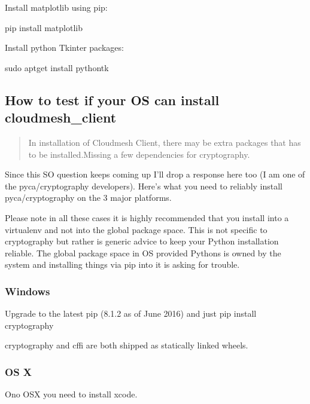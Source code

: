 Install matplotlib using pip:

\begin{sphinxVerbatim}[commandchars=\\\{\}]
\PYGZdl{} pip install matplotlib
\end{sphinxVerbatim}

Install python Tkinter packages:

\begin{sphinxVerbatim}[commandchars=\\\{\}]
\PYGZdl{} sudo apt\PYGZhy{}get install python\PYGZhy{}tk
\end{sphinxVerbatim}


\subsection{How to test if your OS can install cloudmesh\_client}
\label{\detokenize{faq:how-to-test-if-your-os-can-install-cloudmesh-client}}\begin{quote}

In installation of Cloudmesh Client, there may be extra packages that has to be installed.Missing a few dependencies for cryptography.
\end{quote}

Since this SO question keeps coming up I'll drop a response here too (I am one of the pyca/cryptography developers). Here's what you need to reliably install pyca/cryptography on the 3 major platforms.

Please note in all these cases it is highly recommended that you install into a virtualenv and not into the global package space. This is not specific to cryptography but rather is generic advice to keep your Python installation reliable. The global package space in OS provided Pythons is owned by the system and installing things via pip into it is asking for trouble.


\subsubsection{Windows}
\label{\detokenize{faq:windows}}
Upgrade to the latest pip (8.1.2 as of June 2016) and just pip install cryptography

cryptography and cffi are both shipped as statically linked wheels.


\subsubsection{OS X}
\label{\detokenize{faq:os-x}}
Ono OSX you need to install xcode.

